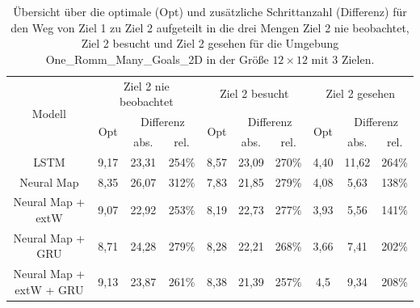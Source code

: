 \begin{table}
  \begin{tabular}{|c|c|c|c|c|c|c|c|c|c|}
    \hline
    \multirow{3}{*}{Modell} & \multicolumn{3}{|c|}{Ziel 2 nie beobachtet} & \multicolumn{3}{|c|}{Ziel 2 besucht} & \multicolumn{3}{|c|}{Ziel 2 gesehen} \\ \cline{2-10}
    & \multirow{2}{*}{Opt} & \multicolumn{2}{|c|}{Differenz} & \multirow{2}{*}{Opt} & \multicolumn{2}{|c|}{Differenz} & \multirow{2}{*}{Opt} & \multicolumn{2}{|c|}{Differenz} \\ \cline{3-4} \cline{6-7} \cline{9-10}
    & & abs. & rel. & & abs. & rel. & & abs. & rel. \\ \hline
    LSTM & 9,17 & 23,31 & 254\% & 8,57 & 23,09 & 270\% & 4,40 & 11,62 & 264\% \\ \hline
    Neural Map & 8,35 & 26,07 & 312\% & 7,83 & 21,85 & 279\% & 4,08 & 5,63 & 138\% \\ \hline
    Neural Map + extW & 9,07 & 22,92 & 253\% & 8,19 & 22,73 & 277\% & 3,93 & 5,56 & 141\% \\ \hline
    Neural Map + GRU & 8,71 & 24,28 & 279\% & 8,28 & 22,21 & 268\% & 3,66 & 7,41 & 202\% \\ \hline
    Neural Map + extW + GRU & 9,13 & 23,87 & 261\% & 8,38 & 21,39 & 257\% & 4,5 & 9,34 & 208\% \\ \hline
  \end{tabular}
  \caption{Übersicht über die optimale (Opt) und zusätzliche Schrittanzahl (Differenz) für den Weg von Ziel 1 zu Ziel 2 aufgeteilt in die drei Mengen \glqq Ziel 2 nie beobachtet\grqq{}, \glqq Ziel 2 besucht\grqq{} und \glqq Ziel 2 gesehen\grqq{} für die Umgebung \glqq One\_Romm\_Many\_Goals\_2D\grqq{} in der Größe $12 \times 12$ mit 3 Zielen.}
  \label{results12x12_1_to_2_per_M}
\end{table}



